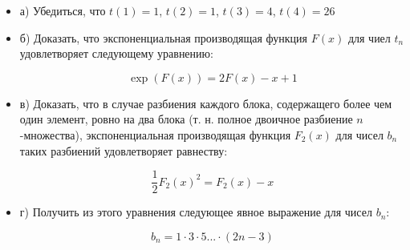 \documentclass[a4paper,12pt]{article}
\begin{document}
\begin{itemize}
\item а) Убедиться, что $t\left(1\right) = 1$, $t\left(2\right) = 1$, $t\left(3\right) = 4$, $t\left(4\right) = 26$

\item б) Доказать, что экспоненциальная производящая функция $F\left(x\right)$ для чиел $t_n$ удовлетворяет следующему уравнению:

\[
	\exp\left(F\left(x\right)\right) = 2 F\left(x\right) - x + 1
\]

\item в) Доказать, что в случае разбиения каждого блока, содержащего более чем один элемент, ровно на два блока (т. н. полное двоичное разбиение $n$-множества), экспоненциальная производящая функция $F_2\left(x\right)$ для чисел $b_n$ таких разбиений удовлетворяет равнеству:

\[
	\frac{1}{2} F_2\left(x\right)^2 = F_2\left(x\right) - x
\]

\item г) Получить из этого уравнения следующее явное выражение для чисел $b_n$:

\[
	b_n = 1\cdot 3 \cdot 5 ... \cdot \left(2n - 3\right)
\]
\end{itemize}
\end{document}
